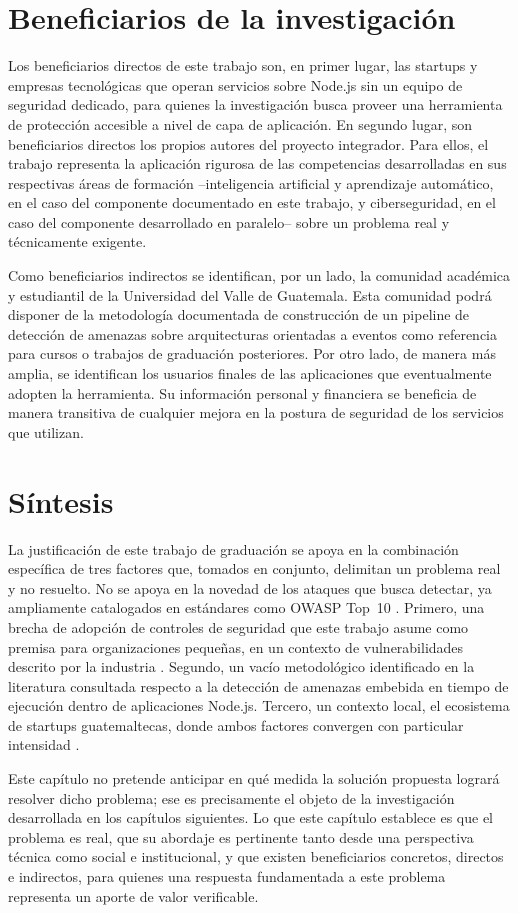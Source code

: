 \section{Beneficiarios de la investigación}

Los beneficiarios directos de este trabajo son, en primer lugar, las startups y empresas tecnológicas que operan servicios sobre Node.js sin un equipo de seguridad dedicado, para quienes la investigación busca proveer una herramienta de protección accesible a nivel de capa de aplicación. En segundo lugar, son beneficiarios directos los propios autores del proyecto integrador. Para ellos, el trabajo representa la aplicación rigurosa de las competencias desarrolladas en sus respectivas áreas de formación --inteligencia artificial y aprendizaje automático, en el caso del componente documentado en este trabajo, y ciberseguridad, en el caso del componente desarrollado en paralelo-- sobre un problema real y técnicamente exigente.

Como beneficiarios indirectos se identifican, por un lado, la comunidad académica y estudiantil de la Universidad del Valle de Guatemala. Esta comunidad podrá disponer de la metodología documentada de construcción de un pipeline de detección de amenazas sobre arquitecturas orientadas a eventos como referencia para cursos o trabajos de graduación posteriores. Por otro lado, de manera más amplia, se identifican los usuarios finales de las aplicaciones que eventualmente adopten la herramienta. Su información personal y financiera se beneficia de manera transitiva de cualquier mejora en la postura de seguridad de los servicios que utilizan.

\section{Síntesis}

La justificación de este trabajo de graduación se apoya en la combinación específica de tres factores que, tomados en conjunto, delimitan un problema real y no resuelto. No se apoya en la novedad de los ataques que busca detectar, ya ampliamente catalogados en estándares como OWASP Top~10 \parencite{owasp2021}. Primero, una brecha de adopción de controles de seguridad que este trabajo asume como premisa para organizaciones pequeñas, en un contexto de vulnerabilidades descrito por la industria \parencite{verizon2024, snyk2024}. Segundo, un vacío metodológico identificado en la literatura consultada respecto a la detección de amenazas embebida en tiempo de ejecución dentro de aplicaciones Node.js. Tercero, un contexto local, el ecosistema de startups guatemaltecas, donde ambos factores convergen con particular intensidad \parencite{mastercard2025}.

Este capítulo no pretende anticipar en qué medida la solución propuesta logrará resolver dicho problema; ese es precisamente el objeto de la investigación desarrollada en los capítulos siguientes. Lo que este capítulo establece es que el problema es real, que su abordaje es pertinente tanto desde una perspectiva técnica como social e institucional, y que existen beneficiarios concretos, directos e indirectos, para quienes una respuesta fundamentada a este problema representa un aporte de valor verificable.
